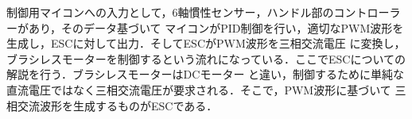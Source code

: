 \documentclass[uplatex,dvipdfmx]{jsarticle}
\begin{document}
制御用マイコンへの入力として，6軸慣性センサー，ハンドル部のコントローラーがあり，そのデータ基づいて
マイコンがPID制御を行い，適切なPWM波形を生成し，ESCに対して出力．そしてESCがPWM波形を三相交流電圧
に変換し，ブラシレスモーターを制御するという流れになっている．ここでESCについての解説を行う．ブラシレスモーターはDCモーター
と違い，制御するために単純な直流電圧ではなく三相交流電圧が要求される．そこで，PWM波形に基づいて
三相交流波形を生成するものがESCである．





\end{document}
